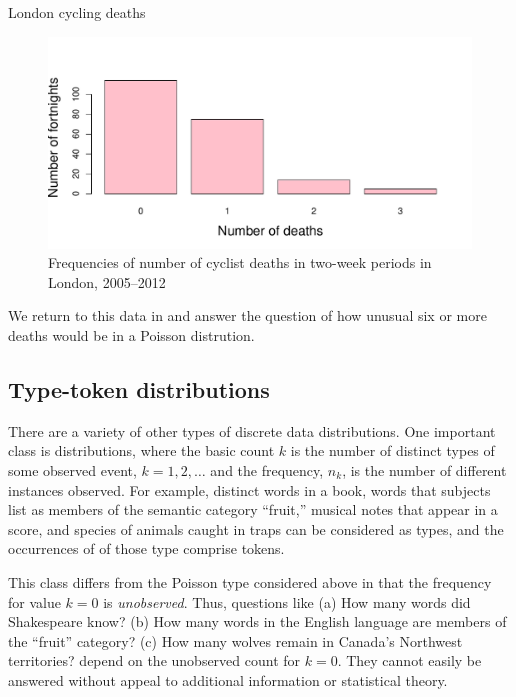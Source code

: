 \documentclass[11pt]{book}
\renewenvironment{knitrout}{\small\renewcommand{\baselinestretch}{.85}}{} %
\begin{document}
\begin{Example}[cyclists1]{London cycling deaths}
\begin{knitrout}
\begin{figure}[!htbp]
\centerline{\includegraphics[width=.75\textwidth]{ch03/fig/cyclists2} }

\caption[Frequencies of number of cyclist deaths in two-week periods in London, 2005--2012]{Frequencies of number of cyclist deaths in two-week periods in London, 2005--2012\label{fig:cyclists2}}
\end{figure}


\end{knitrout}
We return to this data in  and answer the question of
how unusual six or more deaths would be in a Poisson distrution.

\end{Example}

\subsection{Type-token distributions}\label{sec:type-token}

There are a variety of other types of discrete data distributions.
One important class is  distributions, where
the basic count $k$ is the number of distinct types of some observed
event, $k = 1, 2, \dots$ and the frequency, $n_k$, is the number of
different instances observed.  For example, distinct words in a book,
words that subjects list as members of the semantic category ``fruit,''
musical notes that appear in a score, and species of animals caught
in traps can be considered as types, and the occurrences of
of those type comprise tokens.  

This class differs from the Poisson type considered above
in that the frequency for value $k=0$ is \emph{unobserved}.  Thus, questions like
(a) How many words did Shakespeare know?
(b) How many words in the English language are members of the
``fruit'' category?
(c) How many wolves remain in Canada's Northwest territories?
depend on the unobserved count for $k=0$. They 
cannot easily be answered without appeal to additional information
or statistical theory.
\end{document}
